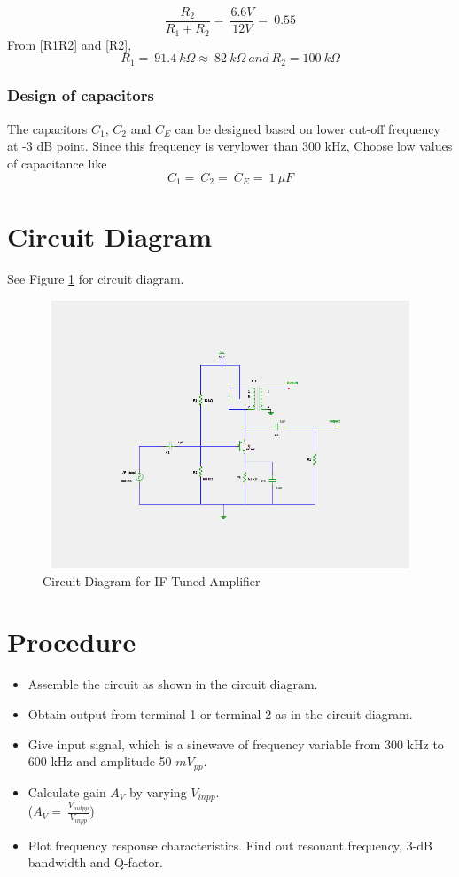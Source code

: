 \documentclass{book}
\begin{document}
\begin{equation}
\label{R2}
\frac{R_2}{R_1+R_2}=\ \frac{6.6V}{12V}=\ 0.55
\end{equation}
From \ref{R1R2} and \ref{R2}, 
\begin{equation}
R_1=\ 91.4\ k\Omega \approx \ 82\ k\Omega \ and \ R_2=100\ k\Omega
\end{equation}
\subsubsection{Design of capacitors}
\noindent The capacitors $C_1$, $C_2$  and $C_E$  can be designed based on lower cut-off frequency at -3 dB point. Since this frequency is verylower than 300 kHz, Choose low values of capacitance like \begin{equation}
C_1=\ C_2=\ C_E=\ 1 \ \mu F
\end{equation}
\section*{Circuit Diagram}
See Figure \ref{IFTuned} for circuit diagram.
\begin{figure}[h]
\includegraphics[width=12cm, height=8cm, trim=4cm 3.5cm 5cm 3.5cm,clip=true]{IFTuned.png}
\caption{Circuit Diagram for IF Tuned Amplifier}
\label{IFTuned}
\end{figure}
\section*{Procedure}
\begin{itemize}
\item
Assemble the circuit as shown in the circuit diagram.
\item
Obtain output from terminal-1 or terminal-2 as in the circuit diagram.
\item
Give input signal, which is a sinewave of frequency variable from 300 kHz to 600 kHz and amplitude 50 $mV_{pp}$.
\item
Calculate gain $A_V$ by varying $V_{inpp}$.\\

($A_V= \ \frac{V_{outpp}}{V_{inpp}}$)

\item
Plot frequency response characteristics. Find out resonant frequency, 3-dB bandwidth and Q-factor.
\end{itemize}
\end{document}
